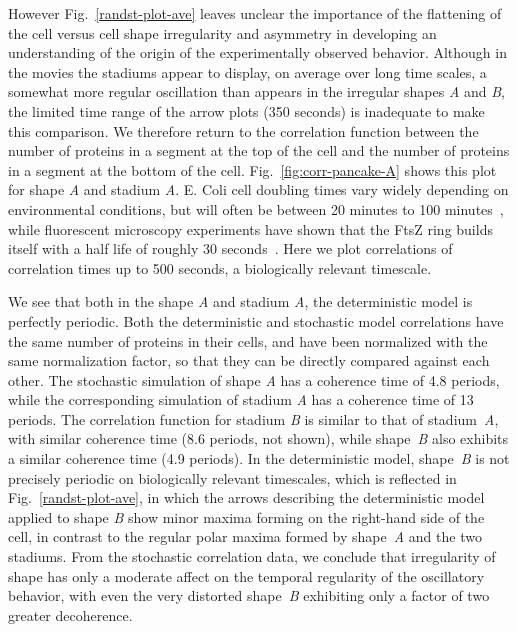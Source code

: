 \documentclass[10pt,letterpaper]{article}
\begin{document}
However Fig.~\ref{randst-plot-ave} leaves unclear the importance of
the flattening of the cell versus cell shape irregularity and
asymmetry in developing an understanding of the origin of the
experimentally observed behavior.  Although in the movies the stadiums
appear to display, on average over long time scales, a somewhat more
regular oscillation than appears in the irregular shapes \emph{A} and
\emph{B}, the limited time range of the arrow plots (350 seconds) is
inadequate to make this comparison.  We therefore return to the
correlation function between the number of proteins in a segment at
the top of the cell and the number of proteins in a segment at the
bottom of the cell.  Fig.~\ref{fig:corr-pancake-A} shows this plot for
shape \emph{A} and stadium \emph{A}.  E. Coli cell doubling times vary
widely depending on environmental conditions, but will often be
between 20 minutes to 100 minutes~\cite{pierucci1972chromosome}, while
fluorescent microscopy experiments have shown that the FtsZ ring
builds itself with a half life of roughly 30
seconds~\cite{stricker2002rapid}.  Here we plot correlations of
correlation times up to 500 seconds, a biologically relevant
timescale.

We see that both in the shape \emph{A} and stadium \emph{A}, the
deterministic model is perfectly periodic.  Both the deterministic and
stochastic model correlations have the same number of proteins in
their cells, and have been normalized with the same normalization
factor, so that they can be directly compared against each other.  The
stochastic simulation of shape \emph{A} has a coherence time of 4.8
periods, while the corresponding simulation of stadium \emph{A} has a
coherence time of 13 periods.
%
The correlation function for stadium \emph{B} is similar to that of
stadium~\emph{A}, with similar coherence time (8.6 periods, not
shown), while shape~\emph{B} also exhibits a similar coherence time (4.9
periods).  In the deterministic model, shape~\emph{B} is not precisely
periodic on biologically relevant timescales, which is reflected in
Fig.~\ref{randst-plot-ave}, in which the arrows describing the
deterministic model applied to shape \emph{B} show minor maxima
forming on the right-hand side of the cell, in contrast to the regular
polar maxima formed by shape~\emph{A} and the two stadiums.
%
From the stochastic correlation data, we conclude that irregularity of
shape has only a moderate affect on the temporal regularity of the
oscillatory behavior, with even the very distorted shape~\emph{B}
exhibiting only a factor of two greater decoherence.
\end{document}
